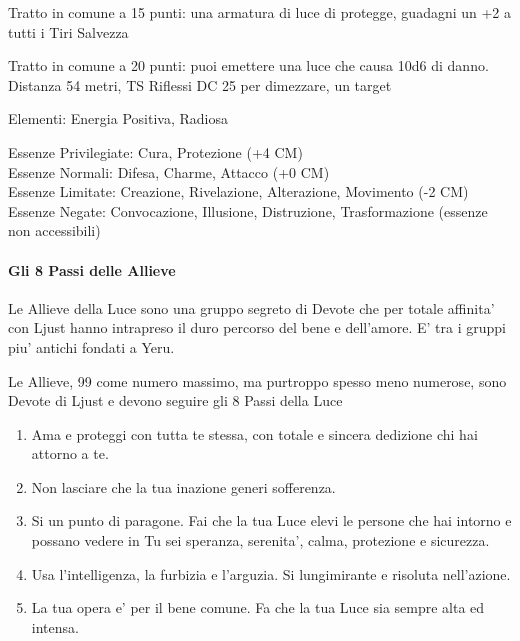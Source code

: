 \documentclass[a4paper,11pt,twoside,openany]{book}
\begin{document}
{Tratto in comune a 15 punti: una armatura di luce di protegge, guadagni un +2 a tutti i Tiri Salvezza

Tratto in comune a 20 punti: puoi emettere una luce che causa 10d6 di danno. Distanza 54 metri, TS Riflessi DC 25 per dimezzare, un target

\bigskip

Elementi: Energia Positiva, Radiosa

\bigskip

Essenze Privilegiate: Cura, Protezione (+4 CM)\\
Essenze Normali: Difesa, Charme, Attacco (+0 CM)\\
Essenze Limitate: Creazione, Rivelazione, Alterazione, Movimento (-2 CM)
Essenze Negate: Convocazione, Illusione, Distruzione, Trasformazione (essenze non accessibili)

\paragraph{Gli 8 Passi delle Allieve}

\label{gli-8-passi-delle-allieve}

Le Allieve della Luce sono una gruppo segreto di Devote che per totale affinita' con Ljust hanno intrapreso il duro percorso del bene e dell'amore. E' tra i gruppi piu' antichi fondati a Yeru.

Le Allieve, 99 come numero massimo, ma purtroppo spesso meno numerose, sono Devote di Ljust e devono seguire gli 8 Passi della Luce

\begin{enumerate}
	\item Ama e proteggi con tutta te stessa, con totale e sincera dedizione chi hai attorno a te.
	
	\item Non lasciare che la tua inazione generi sofferenza.

	\item Si un punto di paragone. Fai che la tua Luce elevi le persone che hai intorno e possano vedere in Tu sei speranza, serenita', calma, protezione e sicurezza.

	\item Usa l'intelligenza, la furbizia e l'arguzia. Si lungimirante e risoluta nell'azione.

	\item La tua opera e' per il bene comune. Fa che la tua Luce sia sempre alta ed intensa.


\end{enumerate}}
\end{document}
